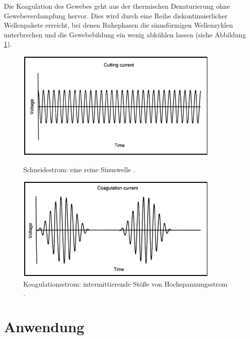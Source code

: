 \documentclass[letterpaper,12pt]{article}
\begin{document}
			Die Koagulation des Gewebes geht aus der thermischen Denaturierung ohne Gewebeverdampfung hervor. Dies wird durch eine Reihe diskontinuierlicher Wellenpakete erreicht, bei denen Ruhephasen die sinusförmigen Wellenzyklen unterbrechen und die Gewebebildung ein wenig abkühlen lassen (siehe Abbildung \ref{fig:koagulationStrom}).
\begin{figure}[ht]
	\centering
	\begin{minipage}[t]{0.45\linewidth}
		\centering
		\includegraphics[width=\linewidth]{images/schneidenStrom.png}
		\caption{Schneidestrom: eine reine Sinuswelle \cite{davidson}.}
		\label{fig:schneidenStrom}
	\end{minipage}%
	\hfill
	\begin{minipage}[t]{0.45\linewidth}
		\centering
		\includegraphics[width=\linewidth]{images/koagulationStrom.png}
		\caption{Koagulationsstrom: intermittierende Stöße von Hochspannungsstrom \cite{davidson}.}
		\label{fig:koagulationStrom}
	\end{minipage}
\end{figure}
		
	\section{Anwendung}
	
\end{document}
